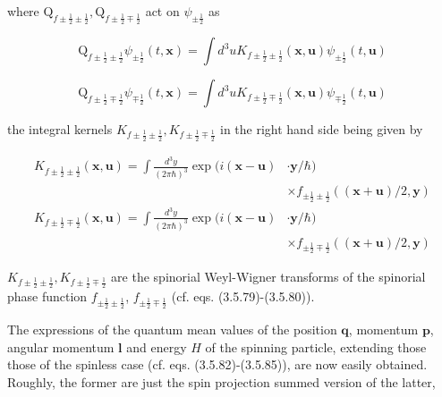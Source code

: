 \documentclass{article}
\begin{document}
where $\mathrm{Q}_{f \pm \frac{1}{2} \pm \frac{1}{2}}, \mathrm{Q}_{f \pm \frac{1}{2} \mp \frac{1}{2}}$ act on $\psi_{ \pm \frac{1}{2}}$ as
 
\begin{equation*}
\mathrm{Q}_{f \pm \frac{1}{2} \pm \frac{1}{2}} \psi_{ \pm \frac{1}{2}}(t, \boldsymbol{x})=\int d^{3} u K_{f \pm \frac{1}{2} \pm \frac{1}{2}}(\boldsymbol{x}, \boldsymbol{u}) \psi_{ \pm \frac{1}{2}}(t, \boldsymbol{u}) \tag{3.21.13a}
\end{equation*}
 
 
\begin{equation*}
\mathrm{Q}_{f \pm \frac{1}{2} \mp \frac{1}{2}} \psi_{\mp \frac{1}{2}}(t, \boldsymbol{x})=\int d^{3} u K_{f \pm \frac{1}{2} \mp \frac{1}{2}}(\boldsymbol{x}, \boldsymbol{u}) \psi_{\mp \frac{1}{2}}(t, \boldsymbol{u}) \tag{3.21.13b}
\end{equation*}
 
the integral kernels $K_{f \pm \frac{1}{2} \pm \frac{1}{2}}, K_{f \pm \frac{1}{2} \mp \frac{1}{2}}$ in the right hand side being given by
 
\begin{align*}
K_{f \pm \frac{1}{2} \pm \frac{1}{2}}(\boldsymbol{x}, \boldsymbol{u})=\int \frac{d^{3} y}{(2 \pi \hbar)^{3}} \exp (i(\boldsymbol{x}-\boldsymbol{u}) & \cdot \boldsymbol{y} / \hbar)  \tag{3.21.14a}\\
& \times f_{ \pm \frac{1}{2} \pm \frac{1}{2}}((\boldsymbol{x}+\boldsymbol{u}) / 2, \boldsymbol{y}) \\
K_{f \pm \frac{1}{2} \mp \frac{1}{2}}(\boldsymbol{x}, \boldsymbol{u})=\int \frac{d^{3} y}{(2 \pi \hbar)^{3}} \exp (i(\boldsymbol{x}-\boldsymbol{u}) & \cdot \boldsymbol{y} / \hbar)  \tag{3.21.14b}\\
& \times f_{ \pm \frac{1}{2} \mp \frac{1}{2}}((\boldsymbol{x}+\boldsymbol{u}) / 2, \boldsymbol{y})
\end{align*}
 
$K_{f \pm \frac{1}{2} \pm \frac{1}{2}}, K_{f \pm \frac{1}{2} \mp \frac{1}{2}}$ are the spinorial Weyl-Wigner transforms of the spinorial phase function $f_{ \pm \frac{1}{2} \pm \frac{1}{2}}$, $f_{ \pm \frac{1}{2} \mp \frac{1}{2}}$ (cf. eqs. (3.5.79)-(3.5.80)).

The expressions of the quantum mean values of the position $\boldsymbol{q}$, momentum $\boldsymbol{p}$, angular momentum $\boldsymbol{l}$ and energy $H$ of the spinning particle, extending those those of the spinless case (cf. eqs. (3.5.82)-(3.5.85)), are now easily obtained. Roughly, the former are just the spin projection summed version of the latter,
 
\end{document}
